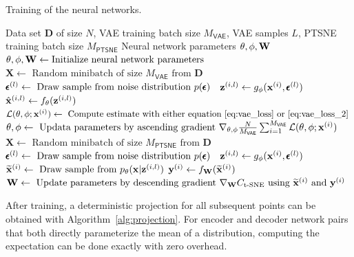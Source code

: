 \begin{algorithm}[H]
  \caption{Training of the neural networks.}
  \label{alg:learning}
  \begin{algorithmic}[1]
    \Require Data set $\mathbf{D}$ of size $N$, VAE training batch size $M_{\mathsf{VAE}}$, VAE samples $L$, PTSNE training batch size $M_{\mathsf{PTSNE}}$
    \Ensure Neural network parameters $\theta, \phi, \mathbf{W}$
    \State $\theta, \phi, \mathbf{W} \gets \text{Initialize neural network parameters}$
      \State $\mathbf{X} \gets \text{ Random minibatch of size } M_{\mathsf{VAE}} \text{ from } \mathbf{D}$
          \State $\pmb{\epsilon}^{(l)} \gets \text{ Draw sample from noise distribution } p(\pmb{\epsilon})$
          \State $\mathbf{z}^{(i,l)} \gets g_{\phi}(\mathbf{x}^{(i)}, \pmb{\epsilon}^{(l)})$ 
          \State $\hat{\mathbf{x}}^{(i,l)} \gets f_{\theta}(\mathbf{z}^{(i,l)})$ 
        \EndFor
        \State $\mathcal{L}(\theta, \phi; \mathbf{x}^{(i)}) \gets \text{ Compute estimate with either equation \ref{eq:vae_loss} or \ref{eq:vae_loss_2} }$
      \EndFor
      \State $\theta, \phi \gets \text{ Updata parameters by ascending gradient } \nabla_{\theta, \phi} \frac{N}{M_{\mathsf{VAE}}} \sum_{i=1}^{M_{\mathsf{VAE}}} \mathcal{L}(\theta, \phi; \mathbf{x}^{(i)})$
    \EndWhile
      \State $\mathbf{X} \gets \text{ Random minibatch of size } M_{\mathsf{PTSNE}} \text{ from } \mathbf{D}$
        \State $\pmb{\epsilon}^{(l)} \gets \text{ Draw sample from noise distribution } p(\pmb{\epsilon})$
        \State $\mathbf{z}^{(i,l)} \gets g_{\phi}(\mathbf{x}^{(i)}, \pmb{\epsilon}^{(l)})$ 
        \State $\widetilde{\mathbf{x}}^{(i)} \gets \text{ Draw sample from } p_{\theta}(\mathbf{x} \vert \mathbf{z}^{(i,l)})$ 
        \State $\mathbf{y}^{(i)} \gets f_{\mathbf{W}}(\widetilde{\mathbf{x}}^{(i)})$
      \EndFor
      \State $\mathbf{W} \gets \text{ Update parameters by descending gradient } \nabla_{\mathbf{W}} C_{\text{t-SNE}} \text{ using } \widetilde{\mathbf{x}}^{(i)} \text{ and } \mathbf{y}^{(i)}$
    \EndWhile
  \end{algorithmic}
\end{algorithm}


After training, a deterministic projection for all subsequent points can be obtained with Algorithm~\ref{alg:projection}. For encoder and decoder network pairs that both directly parameterize the mean of a distribution, computing the expectation can be done exactly with zero overhead.

